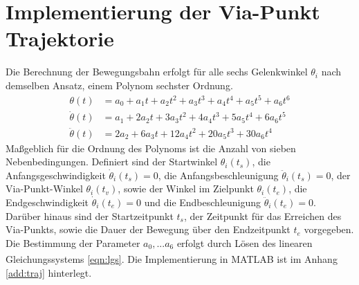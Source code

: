 \chapter{Implementierung der Via-Punkt Trajektorie}
Die Berechnung der Bewegungsbahn erfolgt für alle sechs Gelenkwinkel $\theta_i$ nach demselben Ansatz, einem Polynom sechster Ordnung. 
%
\begin{align}
	\theta(t) &= a_0 + a_1t + a_2t^2 + a_3t^3 + a_4t^4 + a_5t^5  + a_6t^6 \\
	\dot{\theta}(t) &= a_1 + 2a_2t + 3a_3t^2 + 4a_4t^3 + 5a_5t^4  + 6a_6t^5\\
	\ddot{\theta}(t) &= 2a_2 + 6a_3t + 12a_4t^2 + 20a_5t^3  + 30a_6t^4
\end{align}
%
Maßgeblich für die Ordnung des Polynoms ist die Anzahl von sieben Nebenbedingungen.  Definiert sind der Startwinkel $\theta_i(t_s)$, die Anfangsgeschwindigkeit $\dot{\theta}_i(t_s) = 0$, die Anfangsbeschleunigung $\ddot{\theta}_i(t_s) = 0$, der Via-Punkt-Winkel $\theta_i(t_v)$, sowie der Winkel im Zielpunkt $\theta_i(t_e)$, die Endgeschwindigkeit $\dot{\theta}_i(t_e) = 0$ und die Endbeschleunigung $\ddot{\theta}_i(t_e) = 0$. Darüber hinaus sind der Startzeitpunkt $t_s$, der Zeitpunkt für das Erreichen des Via-Punkts, sowie die Dauer der Bewegung über den Endzeitpunkt $t_e$ vorgegeben. 
%
Die Bestimmung der Parameter $a_0, ... a_6$ erfolgt durch Lösen des linearen Gleichungssystems \ref{eqn:lgs}. Die Implementierung in MATLAB\textsuperscript{\textregistered} ist im Anhang \ref{add:traj} hinterlegt.
%
